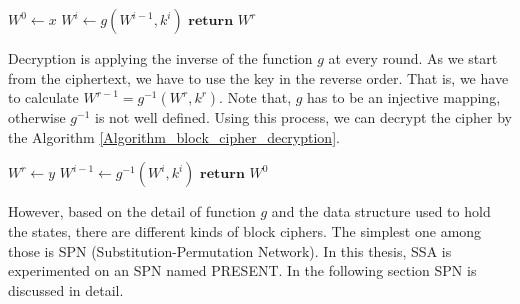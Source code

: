 \begin{algorithm}
\caption{: $E(x,(k^1,...,k^{r}))$}
\label{Algorithm_block_cipher_encryption}
\begin{algorithmic}
\State $W^0 \leftarrow x$
	\State $W^{i} \leftarrow g(W^{i-1},k^{i})$
\EndFor
\State $\textbf{return }W^{r}$
\end{algorithmic}
\end{algorithm}
\par \noindent Decryption is applying the inverse of the function $g$ at every round. As we start from the ciphertext, we have to use the key in the reverse order. That is, we have to calculate $W^{r-1} = g^{-1}(W^{r},k^{r})$. Note that, $g$ has to be an injective mapping, otherwise $g^{-1}$ is not well defined. Using this process, we can decrypt the cipher by the Algorithm \ref{Algorithm_block_cipher_decryption}.
\begin{algorithm}
\caption{: $D(y,(k^1,...,k^{r}))$}
\label{Algorithm_block_cipher_decryption}
\begin{algorithmic}
\State $W^{r} \leftarrow y$
	\State $W^{i-1} \leftarrow g^{-1}(W^{i},k^{i})$
\EndFor
\State $\textbf{return }W^{0}$
\end{algorithmic}
\end{algorithm}
However, based on the detail of function $g$ and the data structure used to hold the states, there are different kinds of block ciphers. The simplest one among those is SPN (Substitution-Permutation Network). In this thesis, SSA is experimented on an SPN named PRESENT. In the following section SPN is discussed in detail.

